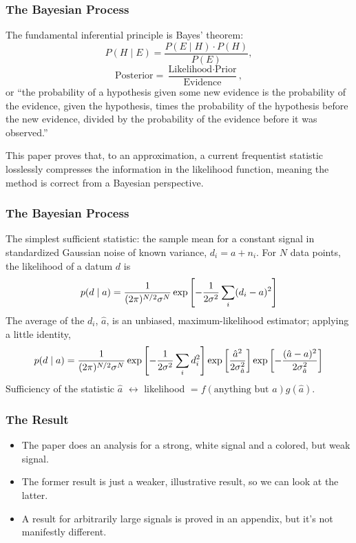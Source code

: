 \documentclass[10pt]{beamer}
\begin{document}
\begin{frame}
  \frametitle{The Bayesian Process}
  The fundamental inferential principle is Bayes' theorem:
  \[
    P(H \mid E) = \frac{P(E \mid H) \cdot P(H)}{P(E)},
  \]
  \[
    \text{Posterior} = \frac{\text{Likelihood} \cdot \text{Prior}}{\text{Evidence}},
  \]
  or ``the probability of a hypothesis given some new evidence is the probability of the evidence, given the hypothesis,
  times the probability of the hypothesis before the new evidence, divided by the probability of the evidence before it was observed.''

  This paper proves that, to an approximation, a current frequentist statistic losslessly compresses the information in the likelihood function,
  meaning the method is correct from a Bayesian perspective.
\end{frame}

\begin{frame}
  \frametitle{The Bayesian Process}
  The simplest sufficient statistic: the sample mean for a constant signal in standardized Gaussian noise of known variance, $d_{i} = a + n_{i}$.
  For $N$ data points, the likelihood of a datum $d$ is
  \[
    p(d \mid a) = \frac{1}{(2\pi)^{N/2}\sigma^{N}}\exp\qty[-\frac{1}{2\sigma^{2}}\sum_{i}(d_{i} - a)^{2}]
  \]
  The average of the $d_{i}$, $\hat{a}$, is an unbiased, maximum-likelihood estimator; applying a little identity,
  \[
    p(d \mid a) = \frac{1}{(2\pi)^{N/2}\sigma^{N}}\exp\qty[-\frac{1}{2\sigma^{2}}\sum_{i}d_{i}^{2}]\exp\qty[\frac{\hat{a}^{2}}{2\sigma^{2}_{\hat{a}}}]
    \exp\qty[-\frac{(\hat{a} - a)^{2}}{2\sigma_{\hat{a}}^{2}}]
  \]
  Sufficiency of the statistic $\hat{a}$ $\longleftrightarrow$ likelihood $=f(\text{anything but } a)g(\hat{a})$.
\end{frame}

\begin{frame}
  \frametitle{The Result}
  \begin{itemize}
  \item The paper does an analysis for a strong, white signal and a colored, but weak signal.
  \item The former result is just a weaker, illustrative result, so we can look at the latter.
  \item A result for arbitrarily large signals is proved in an appendix, but it's not manifestly different.
  \end{itemize}
\end{frame}
\end{document}
